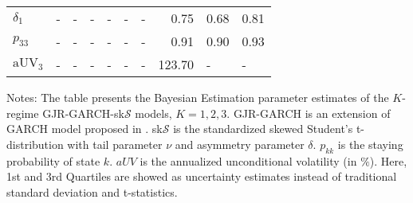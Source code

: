 \documentclass[12pt,a4paper]{article}
\begin{document}
\begin{table}[htbp]
\begin{threeparttable}
\begin{tabular}{llllrrrrrr}
$\delta_1$     & -                                 & -                               & -                               & \multicolumn{1}{l}{-} & \multicolumn{1}{l}{-} & \multicolumn{1}{l}{-} & 0.75          & 0.68                  & 0.81                  \\
$p_33$         & -                                 & -                               & -                               & \multicolumn{1}{l}{-} & \multicolumn{1}{l}{-} & \multicolumn{1}{l}{-} & 0.91          & 0.90                  & 0.93                  \\
$\text{aUV}_3$ & -                                 & -                               & -                               & \multicolumn{1}{l}{-} & \multicolumn{1}{l}{-} & \multicolumn{1}{l}{-} & 123.70        & \multicolumn{1}{l}{-} & \multicolumn{1}{l}{-} \\ \hline
\end{tabular}
\begin{tablenotes}
\small
\item Notes: The table presents the Bayesian Estimation parameter estimates of the $K$-regime GJR-GARCH-sk$\mathcal{S}$ models, $K = 1, 2, 3$. GJR-GARCH is an extension of GARCH model proposed in \cite{glosten1993relation}. sk$\mathcal{S}$ is the standardized skewed Student's t-distribution with tail parameter $\nu$ and asymmetry parameter $\delta$. $p_{kk}$ is the staying probability of state $k$. $aUV$ is the annualized unconditional volatility (in $\%$). Here, 1st and 3rd Quartiles are showed as uncertainty estimates instead of traditional standard deviation and t-statistics.
\end{tablenotes}
\end{threeparttable}
\end{table}
\end{document}
